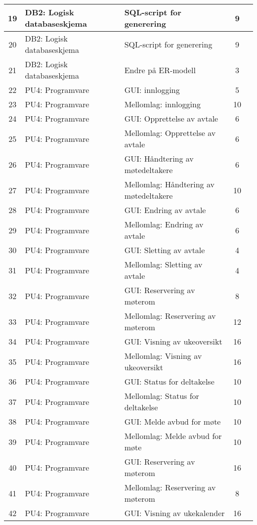 \begin{table}
{\begin{tabularx}{1.3\textwidth}{|c|l|X|c|c|}
	19 & DB2: Logisk databaseskjema & SQL-script for generering & 9 & \\ \hline
	20 & DB2: Logisk databaseskjema & SQL-script for generering & 9 & \\ \hline
	21 & DB2: Logisk databaseskjema & Endre på ER-modell & 3 & \\ \hline
	22 & PU4: Programvare & GUI: innlogging & 5 & \\ \hline
	23 & PU4: Programvare & Mellomlag: innlogging & 10 & \\ \hline
	24 & PU4: Programvare & GUI: Opprettelse av avtale & 6 & \\ \hline
	25 & PU4: Programvare & Mellomlag: Opprettelse av avtale & 6 & \\ \hline
	26 & PU4: Programvare & GUI: Håndtering av møtedeltakere & 6 & \\ \hline
	27 & PU4: Programvare & Mellomlag: Håndtering av møtedeltakere & 10 & \\ \hline
	28 & PU4: Programvare & GUI: Endring av avtale & 6 & \\  \hline
	29 & PU4: Programvare & Mellomlag: Endring av avtale & 6 & \\ \hline
	30 & PU4: Programvare & GUI: Sletting av avtale & 4 & \\ \hline
	31 & PU4: Programvare & Mellomlag: Sletting av avtale & 4 & \\ \hline
	32 & PU4: Programvare & GUI: Reservering av møterom & 8 & \\ \hline
	33 & PU4: Programvare & Mellomlag: Reservering av møterom & 12 & \\ \hline
	34 & PU4: Programvare & GUI: Visning av ukeoversikt & 16 & \\ \hline
	35 & PU4: Programvare & Mellomlag:  Visning av ukeoversikt  & 16 & \\ \hline
	36 & PU4: Programvare & GUI: Status for deltakelse & 10 & \\ \hline
	37 & PU4: Programvare & Mellomlag: Status for deltakelse  & 10 & \\ \hline
	38 & PU4: Programvare & GUI: Melde avbud for møte & 10 & \\ \hline
	39 & PU4: Programvare & Mellomlag: Melde avbud for møte  & 10 & \\ \hline
	40 & PU4: Programvare & GUI: Reservering av møterom & 16 & \\ \hline
	41 & PU4: Programvare & Mellomlag: Reservering av møterom & 8 & \\ \hline
	42 & PU4: Programvare & GUI: Visning av ukekalender & 16 & \\ \hline

\end{tabularx}}
\end{table}
